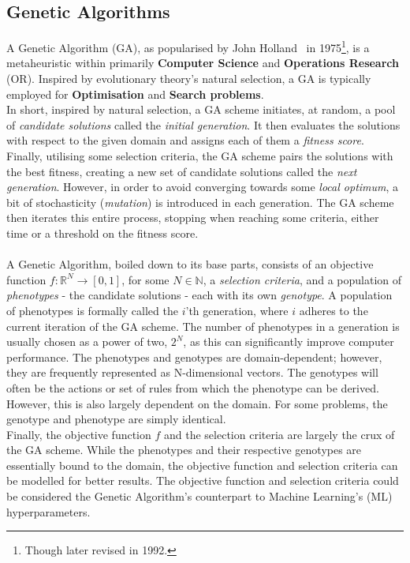 \subsection{Genetic Algorithms}
A Genetic Algorithm (GA), as popularised by John Holland~\cite{Genetic-Algorithm-original} in 1975\footnote{Though later revised in 1992.}, is a metaheuristic within primarily \textbf{Computer Science} and \textbf{Operations Research} (OR). Inspired by evolutionary theory's natural selection, a GA is typically employed for \textbf{Optimisation} and \textbf{Search problems}.
\\
In short, inspired by natural selection, a GA scheme initiates, at random, a pool of \textit{candidate solutions} called the \textit{initial generation}. It then evaluates the solutions with respect to the given domain and assigns each of them a \textit{fitness score}. Finally, utilising some selection criteria, the GA scheme pairs the solutions with the best fitness, creating a new set of candidate solutions called the \textit{next generation}. However, in order to avoid converging towards some \textit{local optimum}, a bit of stochasticity (\textit{mutation}) is introduced in each generation. The GA scheme then iterates this entire process, stopping when reaching some criteria, either time or a threshold on the fitness score.
\\
\\
A Genetic Algorithm, boiled down to its base parts, consists of an objective function $f : \mathbb{R}^N \rightarrow [0,1]$, for some $N \in \mathbb{N}$, a \textit{selection criteria}, and a population of \textit{phenotypes} - the candidate solutions - each with its own \textit{genotype}. A population of phenotypes is formally called the $i$'th generation, where $i$ adheres to the current iteration of the GA scheme. The number of phenotypes in a generation is usually chosen as a power of two, $2^N$, as this can significantly improve computer performance. The phenotypes and genotypes are domain-dependent; however, they are frequently represented as N-dimensional vectors. The genotypes will often be the actions or set of rules from which the phenotype can be derived. However, this is also largely dependent on the domain. For some problems, the genotype and phenotype are simply identical.
\\
Finally, the objective function $f$ and the selection criteria are largely the crux of the GA scheme. While the phenotypes and their respective genotypes are essentially bound to the domain, the objective function and selection criteria can be modelled for better results. The objective function and selection criteria could be considered the Genetic Algorithm's counterpart to Machine Learning's (ML) hyperparameters.
